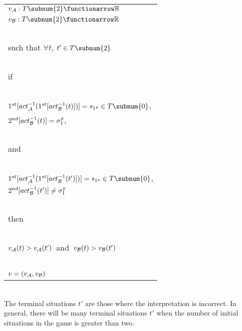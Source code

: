 \begin{definition} \begin{tabular}[t]{l} {$v_{\cal A}: T\subnum{2} \functionarrow \mathbb{R}$}\\
{$v_{\cal B}: T\subnum{2} \functionarrow \mathbb{R}$}\\
~\\
{such that $\forall t$, $t' \in T\subnum{2}$}\\
~\\
{if}\\
~\\
{$1^{st}[act_{\cal A}^{-1}(1^{st}[act_{\cal B}^{-1}(t)])] = s_{1^y} \in T\subnum{0}$,}\\
{$2^{nd}[act_{\cal B}^{-1}(t)] = \sigma_1^y$,}\\
~\\
{and}\\
~\\
{$1^{st}[act_{\cal A}^{-1}(1^{st}[act_{\cal B}^{-1}(t')])] = s_{1^y} \in T\subnum{0}$,}\\
{$2^{nd}[act_{\cal B}^{-1}(t')] \neq \sigma_1^y$}\\
~\\
{then}\\
~\\
{$v_{\cal A}(t) > v_{\cal A}(t')$}\ {and}\ {$v_{\cal B}(t) > v_{\cal B}(t')$}\\
~\\
{$v = (v_{\cal A}, v_{\cal B})$}

\end{tabular} \end{definition}
~\\
\noindent The terminal situations $t'$ are those where the interpretation is incorrect. In general, there will be many terminal situations $t'$ when the number of initial situations in the game is greater than two. 

